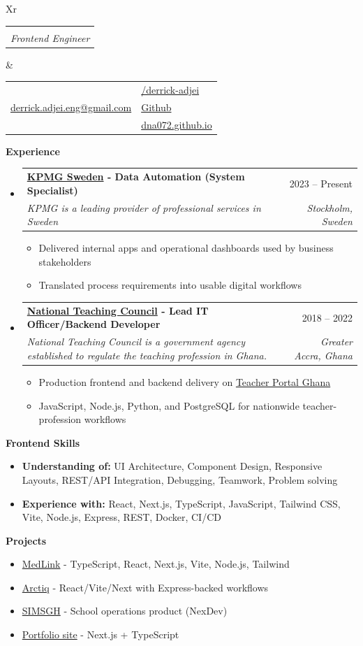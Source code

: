 \documentclass[a4paper,12pt]{article}[leftmargin=*]
\makeatletter
\def \fullname {Derrick Adjei}
\def \subtitle {Frontend Engineer}
\def \linkedinicon {\faLinkedin}
\def \linkedinlink {https://www.linkedin.com/in/derrick-adjei-5421289a/}
\def \linkedintext {/derrick-adjei}
\def \phoneicon {\faPhone}
\def \phonetext {+46-76-251-7998}
\def \emailicon {\faEnvelope}
\def \emaillink {mailto:derrick.adjei.eng@gmail.com}
\def \emailtext {derrick.adjei.eng@gmail.com}
\def \githubicon {\faGithub}
\def \githublink {https://github.com/Dna072/}
\def \githubtext {Github}
\def \websiteicon {\faGlobe}
\def \websitelink {https://dna072.github.io/}
\def \websitetext {dna072.github.io}
\def \headertype {\doublecol}
\def \entryspacing {-0pt}
\def \linkedin {\linkedinicon \hspace{3pt}\href{\linkedinlink}{\linkedintext}}
\def \phone {\phoneicon \hspace{3pt}{ \phonetext}}
\def \email {\emailicon \hspace{3pt}\href{\emaillink}{\emailtext}}
\def \github {\githubicon \hspace{3pt}\href{\githublink}{\githubtext}}
\def \website {\websiteicon \hspace{3pt}\href{\websitelink}{\websitetext}}
\renewcommand{\section}[2]{\vspace{5pt}
  \colorbox{secondary}{\color{white}\raggedbottom\normalsize\textbf{{#1}{\hspace{7pt}#2}}}
}
\newcommand{\resumeEntryStart}{\begin{itemize}[leftmargin=2.5mm]}
\newcommand{\resumeEntryEnd}{\end{itemize}\vspace{\entryspacing}}
\newcommand{\resumeItemListStart}{\begin{itemize}[leftmargin=4.5mm]}
\newcommand{\resumeItemListEnd}{\end{itemize}}
\newcommand{\resumeItem}[1]{
  \item\small{
    {#1 \vspace{-2pt}}
  }
}
\newcommand{\resumeEntryTSDL}[4]{
  \vspace{-1pt}\item[]
    \begin{tabularx}{0.99\textwidth}{X@{\hspace{60pt}}r}
      \textbf{\color{primary}#1} & {\firabook\color{accent}\small#2} \\
      \textit{\color{accent}\small#3} & \textit{\color{accent}\small#4} \\
    \end{tabularx}\vspace{-7pt}
}
\newcommand{\resumeEntryS}[2]{
  \item[]\small{
    \textbf{\color{primary}#1 }{ #2 \vspace{-6pt}}
  }
}
\newcommand{\doublecol}[6]{
  \begin{tabularx}{\textwidth}{Xr}
    {
      \begin{tabular}[c]{l}
        \fontsize{35}{45}\selectfont{\color{primary}{{\textbf{\fullname}}}} \\
        {\textit{\subtitle}}
      \end{tabular}
    } & {
      \begin{tabular}[c]{l@{\hspace{1.5em}}l}
        {\small#4} & {\small#1} \\
        {\small#5} & {\small#2} \\
        {\small#6} & {\small#3}
      \end{tabular}
    }
  \end{tabularx}
}
\makeatother
\begin{document}
\headertype{\linkedin}{\github}{\website}{\phone}{\email}{}
\vspace{-5pt}

\vspace{5pt}
\section{\faPieChart}{Experience}
  \resumeEntryStart
  \vspace{-10pt}
    \resumeEntryTSDL
      {\href{https://kpmg.se/}{KPMG Sweden} - Data Automation (System Specialist)}{2023 -- Present}
      {KPMG is a leading provider of professional services in Sweden}{Stockholm, Sweden}
    \resumeItemListStart
      \resumeItem {Delivered internal apps and operational dashboards used by business stakeholders}
      \resumeItem {Translated process requirements into usable digital workflows}
    \resumeItemListEnd
  \resumeEntryEnd

  \resumeEntryStart
    \vspace{-7pt}
    \resumeEntryTSDL
      {\href{https://ntc.gov.gh/}{National Teaching Council} - Lead IT Officer/Backend Developer}{2018 -- 2022}
      {National Teaching Council is a government agency established to regulate the teaching profession in Ghana.}{Greater Accra, Ghana}
    \resumeItemListStart
      \resumeItem {Production frontend and backend delivery on {\href{https://tpg.ntc.gov.gh}{Teacher Portal Ghana}}}
      \resumeItem {JavaScript, Node.js, Python, and PostgreSQL for nationwide teacher-profession workflows}
    \resumeItemListEnd
  \resumeEntryEnd

\section{\faGears} {Frontend Skills}
 \resumeEntryStart
  \resumeEntryS
    {Understanding of:}
    {UI Architecture, Component Design, Responsive Layouts, REST/API Integration, Debugging, Teamwork, Problem solving}

  \resumeEntryS
    {Experience with:}
    {\color{black} React, Next.js, TypeScript, JavaScript, Tailwind CSS, Vite, Node.js, Express, REST, Docker, CI/CD}
 \resumeEntryEnd

\vspace{2pt}
\section{\faGears} {Projects}
 \resumeEntryStart
  \resumeEntryS
    {}
    {
        {\href{https://medlink.nexdev.tech}{MedLink}} - {TypeScript, React, Next.js, Vite, Node.js, Tailwind}
    }
  \resumeEntryS
    {}
    {
        {\href{https://arctiq.nexdev.tech}{Arctiq}} - {React/Vite/Next with Express-backed workflows}
    }
  \resumeEntryS
    {}
    {
        {\href{https://simsgh.com}{SIMSGH}} - {School operations product (NexDev)}
    }
  \resumeEntryS
    {}
    {
        {\href{https://github.com/Dna072/Portfolio}{Portfolio site}} - {Next.js + TypeScript}
    }
 \resumeEntryEnd
\end{document}
